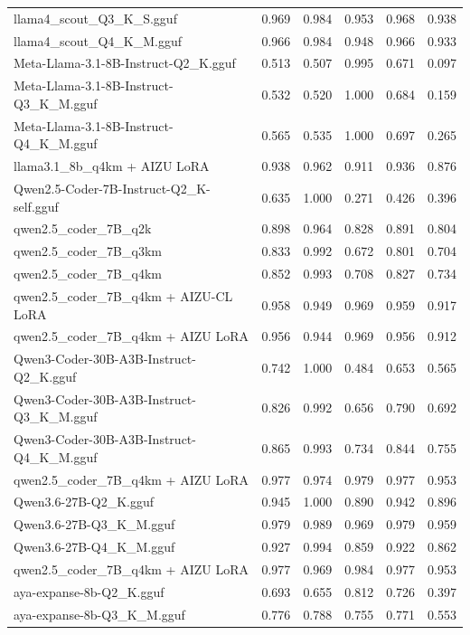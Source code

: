 \begin{table}[htbp]
{\begin{tabular}{lrrrrr}
    llama4\_scout\_Q3\_K\_S.gguf & 0.969 & 0.984 & 0.953 & 0.968 & 0.938 \\
    llama4\_scout\_Q4\_K\_M.gguf & 0.966 & 0.984 & 0.948 & 0.966 & 0.933 \\
    Meta-Llama-3.1-8B-Instruct-Q2\_K.gguf & 0.513 & 0.507 & 0.995 & 0.671 & 0.097 \\
    Meta-Llama-3.1-8B-Instruct-Q3\_K\_M.gguf & 0.532 & 0.520 & 1.000 & 0.684 & 0.159 \\
    Meta-Llama-3.1-8B-Instruct-Q4\_K\_M.gguf & 0.565 & 0.535 & 1.000 & 0.697 & 0.265 \\
    llama3.1\_8b\_q4km + AIZU LoRA & 0.938 & 0.962 & 0.911 & 0.936 & 0.876 \\
    Qwen2.5-Coder-7B-Instruct-Q2\_K-self.gguf & 0.635 & 1.000 & 0.271 & 0.426 & 0.396 \\
    qwen2.5\_coder\_7B\_q2k & 0.898 & 0.964 & 0.828 & 0.891 & 0.804 \\
    qwen2.5\_coder\_7B\_q3km & 0.833 & 0.992 & 0.672 & 0.801 & 0.704 \\
    qwen2.5\_coder\_7B\_q4km & 0.852 & 0.993 & 0.708 & 0.827 & 0.734 \\
    qwen2.5\_coder\_7B\_q4km + AIZU-CL LoRA & 0.958 & 0.949 & 0.969 & 0.959 & 0.917 \\
    qwen2.5\_coder\_7B\_q4km + AIZU LoRA & 0.956 & 0.944 & 0.969 & 0.956 & 0.912 \\
    Qwen3-Coder-30B-A3B-Instruct-Q2\_K.gguf & 0.742 & 1.000 & 0.484 & 0.653 & 0.565 \\
    Qwen3-Coder-30B-A3B-Instruct-Q3\_K\_M.gguf & 0.826 & 0.992 & 0.656 & 0.790 & 0.692 \\
    Qwen3-Coder-30B-A3B-Instruct-Q4\_K\_M.gguf & 0.865 & 0.993 & 0.734 & 0.844 & 0.755 \\
    qwen2.5\_coder\_7B\_q4km + AIZU LoRA & 0.977 & 0.974 & 0.979 & 0.977 & \cellcolor{green!30}0.953 \\
    Qwen3.6-27B-Q2\_K.gguf & 0.945 & 1.000 & 0.890 & 0.942 & 0.896 \\
    Qwen3.6-27B-Q3\_K\_M.gguf & 0.979 & 0.989 & 0.969 & 0.979 & \cellcolor{green!50}0.959 \\
    Qwen3.6-27B-Q4\_K\_M.gguf & 0.927 & 0.994 & 0.859 & 0.922 & 0.862 \\
    qwen2.5\_coder\_7B\_q4km + AIZU LoRA & 0.977 & 0.969 & 0.984 & 0.977 & \cellcolor{green!40}0.953 \\
    aya-expanse-8b-Q2\_K.gguf & 0.693 & 0.655 & 0.812 & 0.726 & 0.397 \\
    aya-expanse-8b-Q3\_K\_M.gguf & 0.776 & 0.788 & 0.755 & 0.771 & 0.553 \\

\end{tabular}}
\end{table}
